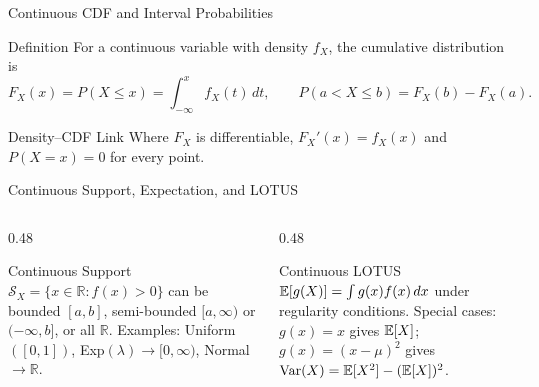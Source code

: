 \documentclass[aspectratio=169,xcolor={dvipsnames,table}]{beamer}
\begin{document}
\begin{frame}{Continuous CDF and Interval Probabilities}
\scriptsize
\begin{block}{Definition}
For a continuous variable with density $f_X$, the cumulative distribution is
\[
F_X(x)=P(X\le x)=\int_{-\infty}^{x}f_X(t)\,dt,
\qquad P(a<X\le b)=F_X(b)-F_X(a).
\]
\end{block}
\begin{alertblock}{Density--CDF Link}
Where $F_X$ is differentiable, $F_X'(x)=f_X(x)$ and $P(X=x)=0$ for every point.
\end{alertblock}
\end{frame}

\begin{frame}{Continuous Support, Expectation, and LOTUS}
	\vspace{-0.15cm}
	\begin{columns}[T]
		\begin{column}{0.48\textwidth}
			\begin{block}{Continuous Support}
				\footnotesize
				$\mathcal{S}_X = \{x \in \mathbb{R} : f(x) > 0\}$ can be bounded $[a,b]$, semi-bounded $[a, \infty)$ or $(-\infty, b]$, or all $\mathbb{R}$. Examples: Uniform$([0,1])$, Exp$(\lambda) \to [0, \infty)$, Normal $\to \mathbb{R}$.
			\end{block}
		\end{column}
		\begin{column}{0.48\textwidth}
			\begin{alertblock}{Continuous LOTUS}
				\footnotesize
				$\mathbb{E}[g(X)] = \int g(x) f(x)\,dx$ under regularity conditions. Special cases: $g(x) = x$ gives $\mathbb{E}[X]$; $g(x) = (x - \mu)^{2}$ gives $\operatorname{Var}(X) = \mathbb{E}[X^{2}] - (\mathbb{E}[X])^{2}$.
			\end{alertblock}
		\end{column}
	\end{columns}
\end{frame}
\end{document}
